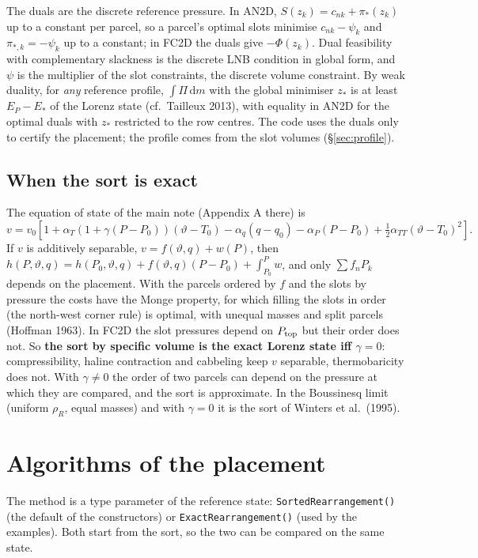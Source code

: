 \documentclass[11pt,a4paper]{article}
\newcommand{\vt}{\vartheta}
\newcommand{\code}[1]{\texttt{#1}}
\newcommand{\Ptop}{P_{\rm top}}
\newcommand{\zs}{z_{*}}
\begin{document}
The duals are the discrete reference pressure. In AN2D, $S(z_k)=c_{nk}+\pi_*(z_k)$ up to a constant per parcel, so a parcel's
optimal slots minimise $c_{nk}-\psi_k$ and $\pi_{*,k}=-\psi_k$ up to a constant; in FC2D the duals give $-\Phi(z_k)$. Dual
feasibility with complementary slackness is the discrete LNB condition in global form, and $\psi$ is the multiplier of the
slot constraints, the discrete volume constraint. By weak duality, for \emph{any} reference profile, $\int\Pi\,\mathrm{d}m$ with
the global minimiser $\zs$ is at least $E_P-E_*$ of the Lorenz state (cf.\ Tailleux 2013), with equality in AN2D for the optimal
duals with $\zs$ restricted to the row centres. The code uses the duals only to certify the placement; the profile comes from
the slot volumes (\S\ref{sec:profile}).

\subsection{When the sort is exact}\label{sec:why}
The equation of state of the main note (Appendix A there) is
\begin{equation}
  v = v_0\left[1+\alpha_T\left(1+\gamma(P-P_0)\right)(\vt-T_0)-\alpha_q(q-q_0)-\alpha_P(P-P_0)+\tfrac12\alpha_{TT}(\vt-T_0)^2\right].
  \label{eq:eos}
\end{equation}
If $v$ is additively separable, $v=f(\vt,q)+w(P)$, then $h(P,\vt,q)=h(P_0,\vt,q)+f(\vt,q)(P-P_0)+\int_{P_0}^Pw$, and only
$\sum f_nP_k$ depends on the placement. With the parcels ordered by $f$ and the slots by pressure the costs have the Monge
property, for which filling the slots in order (the north-west corner rule) is optimal, with unequal masses and split
parcels (Hoffman 1963). In FC2D the slot pressures depend on $\Ptop$ but their order does not. So \textbf{the sort by specific
volume is the exact Lorenz state iff $\gamma=0$}: compressibility, haline contraction and cabbeling keep $v$ separable,
thermobaricity does not. With $\gamma\ne0$ the order of two parcels can depend on the pressure at which they are compared,
and the sort is approximate. In the Boussinesq limit (uniform $\rho_R$, equal masses) and with $\gamma=0$ it is the sort of
Winters et al.\ (1995).

\section{Algorithms of the placement}\label{sec:algorithms}
The method is a type parameter of the reference state: \code{SortedRearrangement()} (the default of the constructors) or
\code{ExactRearrangement()} (used by the examples). Both start from the sort, so the two can be compared on the same state.
\end{document}
